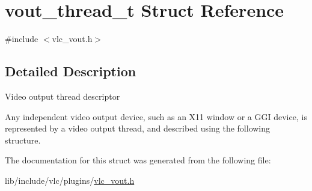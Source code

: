 \hypertarget{structvout__thread__t}{}\section{vout\+\_\+thread\+\_\+t Struct Reference}
\label{structvout__thread__t}


{\ttfamily \#include $<$vlc\+\_\+vout.\+h$>$}



\subsection{Detailed Description}
Video output thread descriptor

Any independent video output device, such as an X11 window or a G\+GI device, is represented by a video output thread, and described using the following structure. 

The documentation for this struct was generated from the following file\+:\begin{DoxyCompactItemize}
\item 
lib/include/vlc/plugins/\hyperlink{vlc__vout_8h}{vlc\+\_\+vout.\+h}\end{DoxyCompactItemize}
